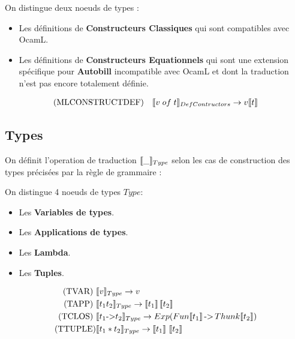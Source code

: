 \documentclass[
  12pt,
]{article}
\providecommand{\tightlist}{%
  \setlength{\itemsep}{0pt}\setlength{\parskip}{0pt}}
\begin{document}
On distingue deux noeuds de types :
\begin{itemize}
  \tightlist
  \item
        Les définitions de \textbf{Constructeurs Classiques} qui sont compatibles avec OcamL.
  \item
        Les définitions de \textbf{Constructeurs Equationnels} qui sont une extension spécifique pour \textbf{Autobill} incompatible avec OcamL et dont la traduction n'est pas encore totalement définie.
\end{itemize}
\begin{align*}
  \text{(MLCONSTRUCTDEF)} \quad & \llbracket v \; of \; t \rrbracket_{DefContructors}   \rightarrow   v\llbracket t \rrbracket \\
\end{align*}

\subsection{Types}\label{types-2}

On définit l'operation de traduction \(\llbracket \_ \rrbracket_{Type}\) selon les cas de construction
des types précisées par la règle de grammaire : 

On distingue 4 noeuds de types $Type$:
\begin{itemize}
  \tightlist
  \item
        Les \textbf{Variables de types}.
  \item
        Les \textbf{Applications de types}.
  \item
        Les \textbf{Lambda}.
  \item
        Les \textbf{Tuples}.
\end{itemize}
\begin{align*}
  \text{(TVAR) }  & \llbracket v \rrbracket_{Type} \rightarrow  v                                                                                          \\
  \text{(TAPP) }  & \llbracket t_1 t_2 \rrbracket_{Type} \rightarrow  \llbracket t_1 \rrbracket \, \llbracket t_2 \rrbracket                                       \\
  \text{(TCLOS) } & \llbracket t_1 \text{->} t_2 \rrbracket_{Type} \rightarrow  Exp (Fun\llbracket t_1 \rrbracket \, \text{->} \, Thunk\llbracket t_2 \rrbracket ) \\
  \text{(TTUPLE)} & \llbracket t_1 * t_2 \rrbracket_{Type} \rightarrow  \llbracket t_1 \rrbracket \,  \, \llbracket t_2 \rrbracket
\end{align*}
\end{document}
